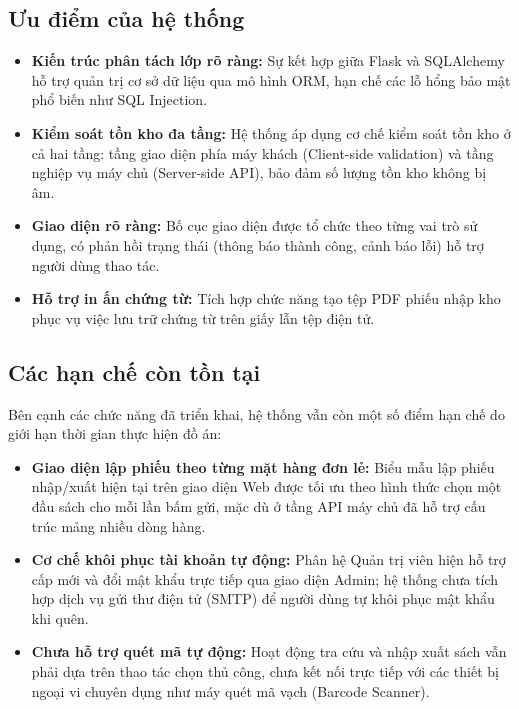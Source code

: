 \documentclass[12pt,a4paper]{article}
\begin{document}
\subsection{Ưu điểm của hệ thống}
\label{subsec:uu-diem}

\begin{itemize}
    \item \textbf{Kiến trúc phân tách lớp rõ ràng:} Sự kết hợp giữa Flask và SQLAlchemy hỗ trợ quản trị cơ sở dữ liệu qua mô hình ORM, hạn chế các lỗ hổng bảo mật phổ biến như SQL Injection.
    \item \textbf{Kiểm soát tồn kho đa tầng:} Hệ thống áp dụng cơ chế kiểm soát tồn kho ở cả hai tầng: tầng giao diện phía máy khách (Client-side validation) và tầng nghiệp vụ máy chủ (Server-side API), bảo đảm số lượng tồn kho không bị âm.
    \item \textbf{Giao diện rõ ràng:} Bố cục giao diện được tổ chức theo từng vai trò sử dụng, có phản hồi trạng thái (thông báo thành công, cảnh báo lỗi) hỗ trợ người dùng thao tác.
    \item \textbf{Hỗ trợ in ấn chứng từ:} Tích hợp chức năng tạo tệp PDF phiếu nhập kho phục vụ việc lưu trữ chứng từ trên giấy lẫn tệp điện tử.
\end{itemize}

\subsection{Các hạn chế còn tồn tại}
\label{subsec:han-che}

Bên cạnh các chức năng đã triển khai, hệ thống vẫn còn một số điểm hạn chế do giới hạn thời gian thực hiện đồ án:
\begin{itemize}
    \item \textbf{Giao diện lập phiếu theo từng mặt hàng đơn lẻ:} Biểu mẫu lập phiếu nhập/xuất hiện tại trên giao diện Web được tối ưu theo hình thức chọn một đầu sách cho mỗi lần bấm gửi, mặc dù ở tầng API máy chủ đã hỗ trợ cấu trúc mảng nhiều dòng hàng.
    \item \textbf{Cơ chế khôi phục tài khoản tự động:} Phân hệ Quản trị viên hiện hỗ trợ cấp mới và đổi mật khẩu trực tiếp qua giao diện Admin; hệ thống chưa tích hợp dịch vụ gửi thư điện tử (SMTP) để người dùng tự khôi phục mật khẩu khi quên.
    \item \textbf{Chưa hỗ trợ quét mã tự động:} Hoạt động tra cứu và nhập xuất sách vẫn phải dựa trên thao tác chọn thủ công, chưa kết nối trực tiếp với các thiết bị ngoại vi chuyên dụng như máy quét mã vạch (Barcode Scanner).
\end{itemize}
\end{document}
